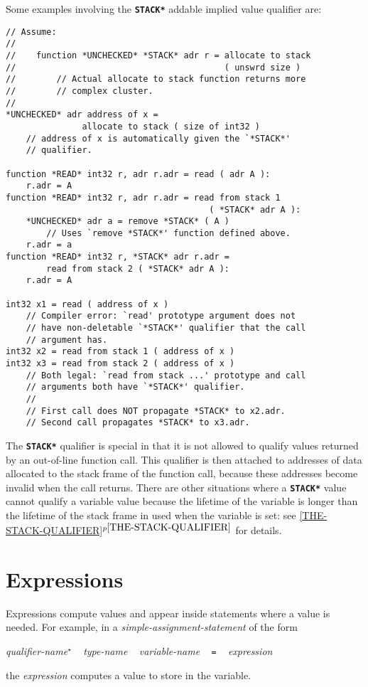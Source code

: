 \documentclass[12pt]{article}
\newcommand{\TT}[1]{{\tt \bfseries #1}}
\newcommand{\itemref}[1]{\ref{#1}$^{p\pageref{#1}}$}
\newcommand{\STAR}{{\Large $^\star$}}
\newenvironment{indpar}[1][0.3in]%
	{\begin{list}{}%
		     {\setlength{\itemsep}{0in}%
		      \setlength{\topsep}{0in}%
		      \setlength{\parsep}{1ex}%
		      \setlength{\labelwidth}{#1}%
		      \setlength{\leftmargin}{#1}%
		      \addtolength{\leftmargin}{\labelsep}}%
	 \item}%
	{\end{list}}
\begin{document}
Some examples involving the \TT{*STACK*} addable implied value
qualifier are:
\begin{indpar}\begin{verbatim}
// Assume:
//
//    function *UNCHECKED* *STACK* adr r = allocate to stack
//                                         ( unswrd size )
//        // Actual allocate to stack function returns more
//        // complex cluster.
//
*UNCHECKED* adr address of x =
               allocate to stack ( size of int32 )
    // address of x is automatically given the `*STACK*'
    // qualifier.

function *READ* int32 r, adr r.adr = read ( adr A ):
    r.adr = A
function *READ* int32 r, adr r.adr = read from stack 1
                                        ( *STACK* adr A ):
    *UNCHECKED* adr a = remove *STACK* ( A )
        // Uses `remove *STACK*' function defined above.
    r.adr = a
function *READ* int32 r, *STACK* adr r.adr =
        read from stack 2 ( *STACK* adr A ):
    r.adr = A

int32 x1 = read ( address of x )
    // Compiler error: `read' prototype argument does not
    // have non-deletable `*STACK*' qualifier that the call
    // argument has.
int32 x2 = read from stack 1 ( address of x )
int32 x3 = read from stack 2 ( address of x )
    // Both legal: `read from stack ...' prototype and call
    // arguments both have `*STACK*' qualifier.
    //
    // First call does NOT propagate *STACK* to x2.adr.
    // Second call propagates *STACK* to x3.adr.
\end{verbatim}\end{indpar}

The \TT{*STACK*} qualifier is special in that it is not allowed to qualify
values returned by an out-of-line function call.
This qualifier is then attached to addresses of data allocated
to the stack frame of the function call, because these addresses become
invalid when the call returns.  There are other situations where
a \TT{*STACK*} value cannot qualify a variable value because the
lifetime of the variable is longer than the lifetime of the
stack frame in used when the variable is set:
see \itemref{THE-STACK-QUALIFIER} for details.

\section{Expressions}
\label{EXPRESSIONS}

Expressions compute values and appear inside statements where a value is needed.
For example, in a {\em simple-assignment-statement} of the form
\begin{indpar}
{\em qualifier-name}\STAR{} ~ {\em type-name} ~ {\em variable-name}
	~ {\tt =} ~ {\em expression}
\end{indpar}
the {\em expression} computes a value to store in the variable.
\end{document}
